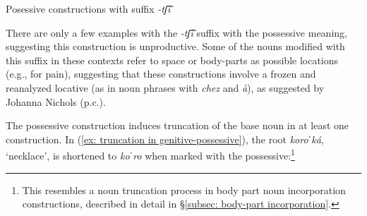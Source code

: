 \ea\label{ex: posessives with -chi}
{Posessive constructions with suffix \textit{-tʃ͡i}}\\

    \label{ex: posessives with -chia}
        \label{ex: posessives with -chib}
            \label{ex: posessives with -chic}
    \z
\z

There are only a few examples with the \textit{-tʃ͡i} suffix with the possessive meaning, suggesting this construction is unproductive. Some of the nouns modified with this suffix in these contexts refer to space or body-parts as possible locations (e.g., for pain), suggesting that these constructions involve a frozen and reanalyzed locative (as in  noun phrases with \textit{chez} and \textit{à}), as suggested by Johanna Nichols (p.c.).

The possessive construction induces truncation of the base noun in at least one construction. In (\ref{ex: truncation in genitive-possessive}), the root \textit{koroˈká}, ‘necklace’, is shortened to \textit{koˈro} when marked with the possessive:\footnote{This resembles a noun truncation process in body part noun incorporation constructions, described in detail in §\ref{subsec: body-part incorporation}.}

